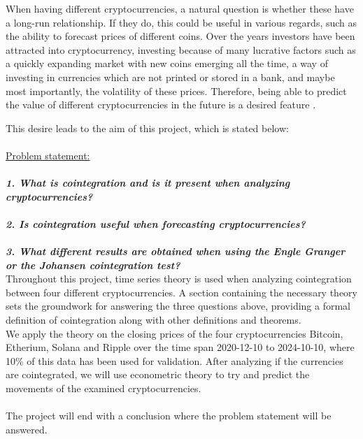 When having different cryptocurrencies, a natural question is whether these have a long-run relationship. If they do, this could be useful in various regards, such as the ability to forecast prices of different coins. Over the years investors have been attracted into cryptocurrency, investing because of many lucrative factors such as a quickly expanding market with new coins emerging all the time, a way of investing in currencies which are not printed or stored in a bank, and maybe most importantly, the volatility of these prices. Therefore, being able to predict the value of different cryptocurrencies in the future is a desired feature \cite{investopedia.} \cite{Coinmarket}.


\newpage
This desire leads to the aim of this project, which is stated below:\\\\
\noindent\makebox[\linewidth]{\rule{\textwidth}{0.4pt}}
\underline{Problem statement:}\\\\
\textbf{\textit{1. What is cointegration and is it present when analyzing cryptocurrencies?}}\\\\
\textbf{\textit{2. Is cointegration useful when forecasting cryptocurrencies?}}\\\\
\textbf{\textit{3. What different results are obtained when using the Engle Granger or the Johansen cointegration test?}}\\
\noindent\makebox[\linewidth]{\rule{\textwidth}{0.4pt}}
Throughout this project, time series theory is used when analyzing cointegration between four different cryptocurrencies. A section containing the necessary theory sets the groundwork for answering the three questions above, providing a formal definition of cointegration along with other definitions and theorems.\\
We apply the theory on the closing prices of the four cryptocurrencies Bitcoin, Etherium, Solana and Ripple over the time span 2020-12-10 to 2024-10-10, where 10\% of this data has been used for validation. After analyzing if the currencies are cointegrated, we will use econometric theory to try and predict the movements of the examined cryptocurrencies.\\\\
The project will end with a conclusion where the problem statement will be answered.



